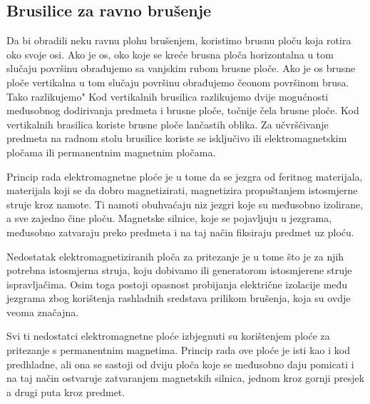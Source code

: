 \documentclass[a4paper,12pt]{article}
\numberwithin{figure}{section}
\begin{document}
\subsection{Brusilice za ravno brušenje}
Da bi obradili neku ravnu plohu brušenjem, koristimo brusnu ploču koja rotira oko svoje osi. Ako je os, oko koje se kreće brusna ploča horizontalna u tom slučaju površinu obrađujemo sa vanjskim rubom brusne ploče. Ako je os brusne ploče vertikalna u tom slučaju površinu obrađujemo čeonom površinom brusa. Tako razlikujemo"
Kod vertikalnih brusilica razlikujemo dvije mogućnosti međusobnog dodirivanja predmeta i brusne ploče, točnije čela brusne ploče. Kod vertikalnih brasilica koriste brusne ploče lančastih oblika.
Za učvrščivanje predmeta na radnom stolu brusilice koriste se isključivo ili elektromagnetskim pločama ili permanentnim magnetnim pločama.\par
Princip rada elektromagnetne ploće je u tome da se jezgra od feritnog materijala, materijala koji se da dobro magnetizirati, magnetizira propuštanjem istosmjerne struje kroz namote. Ti namoti obuhvaćaju niz jezgri koje su međusobno izolirane, a sve zajedno čine ploču. Magnetske silnice, koje se pojavljuju u jezgrama, međusobno zatvaraju preko predmeta i na taj način fiksiraju predmet uz ploću.\par
Nedostatak elektromagnetiziranih ploča za pritezanje je u tome što je za njih potrebna istosmjerna struja, koju dobivamo ili generatorom istosmjerene struje ispravljačima. Osim toga postoji opasnost probijanja električne izolacije među jezgrama zbog korištenja rashladnih sredstava prilikom brušenja, koja su ovdje veoma značajna.\par
Svi ti nedostatci elektromagnetne ploće izbjegnuti su korištenjem ploće za pritezanje s permanentnim magnetima. Princip rada ove ploće je isti kao i kod predhladne, ali ona se sastoji od dviju ploča koje se međusobno daju pomicati i na taj način ostvaruje zatvaranjem magnetskih silnica, jednom kroz gornji presjek a drugi puta kroz predmet. 
\end{document}
